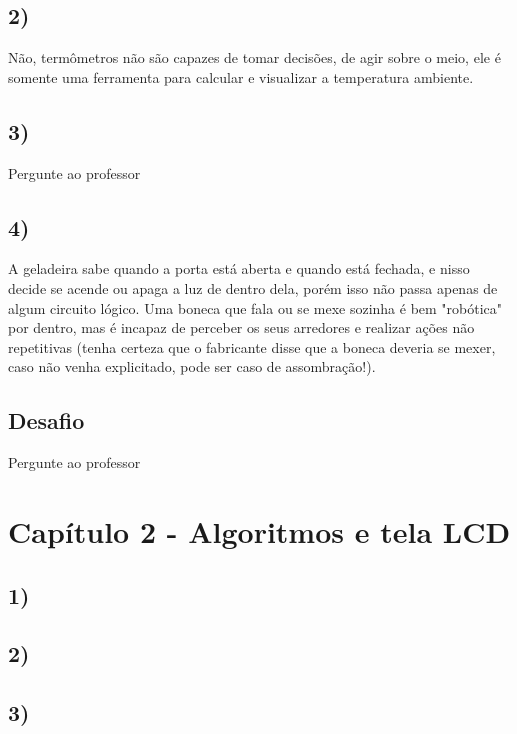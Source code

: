     \subsection*{2)}
        Não, termômetros não são capazes de tomar decisões, de agir sobre o meio, ele é somente uma ferramenta para calcular e visualizar a temperatura ambiente.
        
    \subsection*{3)} Pergunte ao professor
        
    \subsection*{4)}
        A geladeira sabe quando a porta está aberta e quando está fechada, e nisso decide se acende ou apaga a luz de dentro dela, porém isso não passa apenas de algum circuito lógico. Uma boneca que fala ou se mexe sozinha é bem "robótica" por dentro, mas é incapaz de perceber os seus arredores e realizar ações não repetitivas (tenha certeza que o fabricante disse que a boneca deveria se mexer, caso não venha explicitado, pode ser caso de assombração!).
        
    \subsection*{\textbf{Desafio}}
        Pergunte ao professor
        
        
\section*{Capítulo 2 - Algoritmos e tela LCD}

    \subsection*{1)}
    

    
    \subsection*{2)}
    

    
    \subsection*{3)}
    
